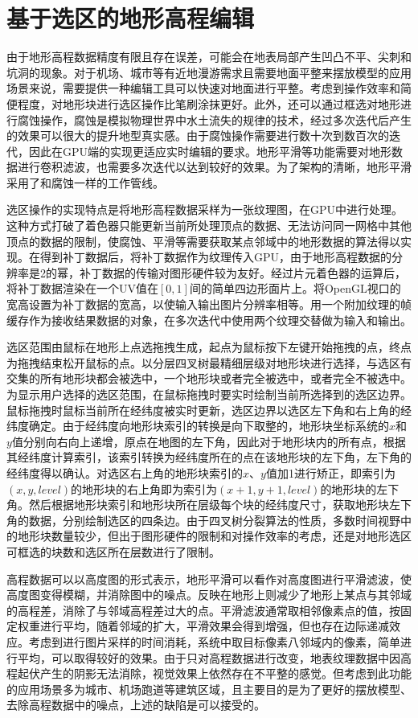 \section{基于选区的地形高程编辑}
由于地形高程数据精度有限且存在误差，可能会在地表局部产生凹凸不平、尖刺和坑洞的现象。对于机场、城市等有近地漫游需求且需要地面平整来摆放模型的应用场景来说，需要提供一种编辑工具可以快速对地面进行平整。考虑到操作效率和简便程度，对地形块进行选区操作比笔刷涂抹更好。此外，还可以通过框选对地形进行腐蚀操作，腐蚀是模拟物理世界中水土流失的规律的技术，经过多次迭代后产生的效果可以很大的提升地型真实感。由于腐蚀操作需要进行数十次到数百次的迭代，因此在GPU端的实现更适应实时编辑的要求。地形平滑等功能需要对地形数据进行卷积滤波，也需要多次迭代以达到较好的效果。为了架构的清晰，地形平滑采用了和腐蚀一样的工作管线。\par
选区操作的实现特点是将地形高程数据采样为一张纹理图，在GPU中进行处理。这种方式打破了着色器只能更新当前所处理顶点的数据、无法访问同一网格中其他顶点的数据的限制，使腐蚀、平滑等需要获取某点邻域中的地形数据的算法得以实现。在得到补丁数据后，将补丁数据作为纹理传入GPU，由于地形高程数据的分辨率是2的幂，补丁数据的传输对图形硬件较为友好。经过片元着色器的运算后，将补丁数据渲染在一个UV值在$[0,1]$间的简单四边形面片上。将OpenGL视口的宽高设置为补丁数据的宽高，以使输入输出图片分辨率相等。用一个附加纹理的帧缓存作为接收结果数据的对象，在多次迭代中使用两个纹理交替做为输入和输出。\par
选区范围由鼠标在地形上点选拖拽生成，起点为鼠标按下左键开始拖拽的点，终点为拖拽结束松开鼠标的点。以分层四叉树最精细层级对地形块进行选择，与选区有交集的所有地形块都会被选中，一个地形块或者完全被选中，或者完全不被选中。为显示用户选择的选区范围，在鼠标拖拽时要实时绘制当前所选择到的选区边界。鼠标拖拽时鼠标当前所在经纬度被实时更新，选区边界以选区左下角和右上角的经纬度确定。由于经纬度向地形块索引的转换是向下取整的，地形块坐标系统的$x$和$y$值分别向右向上递增，原点在地图的左下角，因此对于地形块内的所有点，根据其经纬度计算索引，该索引转换为经纬度所在的点在该地形块的左下角，左下角的经纬度得以确认。对选区右上角的地形块索引的$x$、$y$值加1进行矫正，即索引为$(x,y,level)$的地形块的右上角即为索引为$(x+1,y+1,level)$的地形块的左下角。然后根据地形块索引和地形块所在层级每个块的经纬度尺寸，获取地形块左下角的数据，分别绘制选区的四条边。由于四叉树分裂算法的性质，多数时间视野中的地形块数量较少，但出于图形硬件的限制和对操作效率的考虑，还是对地形选区可框选的块数和选区所在层数进行了限制。\par
高程数据可以以高度图的形式表示，地形平滑可以看作对高度图进行平滑滤波，使高度图变得模糊，并消除图中的噪点。反映在地形上则减少了地形上某点与其邻域的高程差，消除了与邻域高程差过大的点。平滑滤波通常取相邻像素点的值，按固定权重进行平均，随着邻域的扩大，平滑效果会得到增强，但也存在边际递减效应。考虑到进行图片采样的时间消耗，系统中取目标像素八邻域内的像素，简单进行平均，可以取得较好的效果。由于只对高程数据进行改变，地表纹理数据中因高程起伏产生的阴影无法消除，视觉效果上依然存在不平整的感觉。但考虑到此功能的应用场景多为城市、机场跑道等建筑区域，且主要目的是为了更好的摆放模型、去除高程数据中的噪点，上述的缺陷是可以接受的。


